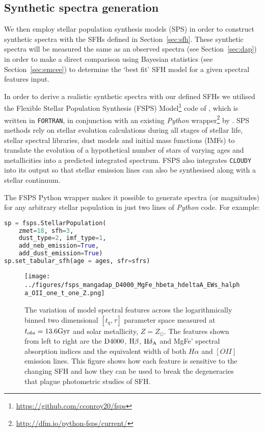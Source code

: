 \documentclass[useAMS,usenatbib]{mn2e}
\begin{document}
\subsection{Synthetic spectra generation}\label{sec:fsps}

We then employ stellar population synthesis models (SPS) in order to construct synthetic spectra with the SFHs defined in Section~\ref{sec:sfh}. These synthetic spectra will be measured the same as an observed spectra (see Section~\ref{sec:dap}) in order to make a direct comparison using Bayesian statistics (see Section~\ref{sec:emcee}) to determine the `best fit' SFH model for a given spectral features input. 

In order to derive a realistic synthetic spectra with our defined SFHs we utilised the Flexible Stellar Population Synthesis (FSPS) Model\footnote{\url{https://github.com/cconroy20/fsps}} code of \cite{conroy09, conroy10}, which is written in \texttt{FORTRAN}, in conjunction with an existing \emph{Python} wrapper\footnote{\url{http://dfm.io/python-fsps/current/}} by \cite{python_fsps}. SPS methods rely on stellar evolution calculations during all stages of stellar life, stellar spectral libraries, dust models and initial mass functions (IMFs) to translate the evolution of a hypothetical number of stars of varying ages and metallicities into a predicted integrated spectrum. FSPS also integrates \texttt{CLOUDY} \citep{ferland13} into its output so that stellar emission lines can also be synthesised along with a stellar continuum. 

The FSPS Python wrapper makes it possible to generate spectra (or magnitudes) for any arbitrary stellar population in just two lines of \emph{Python} code. For example:

\begin{lstlisting}[language=Python]
sp = fsps.StellarPopulation(
	zmet=18, sfh=3, 
	dust_type=2, imf_type=1,
	add_neb_emission=True,  
	add_dust_emission=True)
sp.set_tabular_sfh(age = ages, sfr=sfrs)
\end{lstlisting}

\begin{figure*}
\centering
\texttt{[image: ../figures/fsps\_mangadap\_D4000\_MgFe\_hbeta\_hdeltaA\_EWs\_halpha\_OII\_one\_t\_one\_Z.png]}
\caption{The variation of model spectral features across the logarithmically binned two dimensional $[t_q, \tau]$ parameter space measured at $t_{obs}=13.6\rm{Gyr}$ and solar metallicity, $Z=Z_{\odot}$. The features shown from left to right are the $\rm{D}4000$, $\rm{H}\beta$, $\rm{H}\delta_A$ and MgFe' spectral absorption indices and the equivalent width of both $H\alpha$ and $[OII]$ emission lines. This figure shows how each feature is sensitive to the changing SFH and how they can be used to break the degeneracies that plague photometric studies of SFH. }
\label{fig:rainbow}
\end{figure*}
\end{document}
